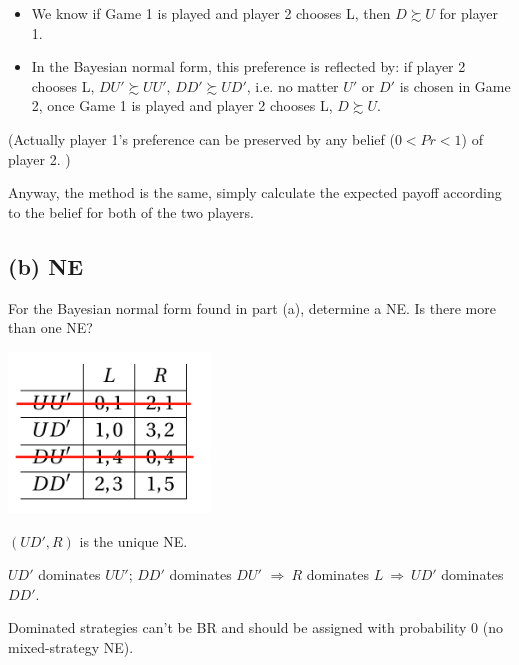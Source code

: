 \documentclass{article}
\begin{document}
\begin{mdframed}[backgroundcolor=blue!20,linecolor=white]
\begin{itemize}
\begin{itemize}
\item We know if Game 1 is played and player 2 chooses L, then $D \succsim U$ for player 1.
\item In the Bayesian normal form, this preference is reflected by: if player 2 chooses L, $DU' \succsim UU'$, $DD' \succsim UD'$, i.e. no matter $U'$ or $D'$ is chosen in Game 2, once Game 1 is played and player 2 chooses L,  $D \succsim U$.
\end{itemize}
(Actually player 1's  preference can be preserved by any belief ($0<Pr<1$) of player 2. )

\end{itemize}

Anyway, the method is the same, simply calculate the expected payoff according to the belief for both of the two players.
\end{mdframed}


\subsection*{(b) NE}

For the Bayesian normal form found in part (a), determine a NE. Is there more than one NE?

\bigskip

\begin{center}
\includegraphics[width=0.4\textwidth]{9.q1}
\vspace{2mm}
\end{center}

\medskip

$(UD',R)$ is the unique NE.

\begin{mdframed}[backgroundcolor=blue!20,linecolor=white]
$UD'$ dominates $UU'$; $DD'$ dominates $DU'$ $\Rightarrow \ R$ dominates $L \ \Rightarrow \ UD'$ dominates $DD'$. 

\medskip

Dominated strategies can't be BR and should be assigned with probability 0 (no mixed-strategy NE).
\end{mdframed}
\end{document}
